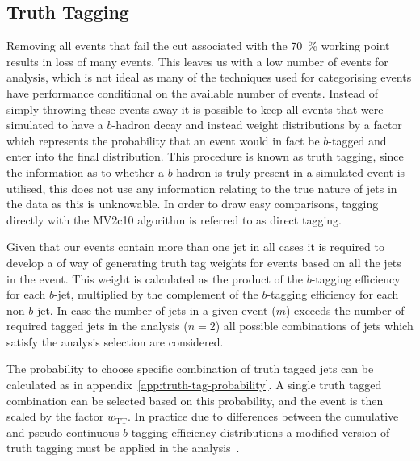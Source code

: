 \subsection{Truth Tagging}
\label{subsec:truth-tagging}

Removing all events that fail the cut associated with the 70~\% working point
results in loss of many events. This leaves us with a low number of events for
analysis, which is not ideal as many of the techniques used for categorising
events have performance conditional on the available number of events. Instead
of simply throwing these events away it is possible to keep all events that were
simulated to have a $b$-hadron decay and instead weight distributions by a
factor which represents the probability that an event would in fact be
$b$-tagged and enter into the final distribution. This procedure is known as
truth tagging, since the information as to whether a $b$-hadron is truly present
in a simulated event is utilised, this does not use any information relating to
the true nature of jets in the data as this is unknowable. In order to draw easy
comparisons, tagging directly with the MV2c10 algorithm is referred to as direct
tagging.

Given that our events contain more than one jet in all cases it is required to
develop a of way of generating truth tag weights for events based on all the
jets in the event. This weight is calculated as the product of the $b$-tagging
efficiency for each $b$-jet, multiplied by the complement of the $b$-tagging
efficiency for each non $b$-jet. In case the number of jets in a given event
($m$) exceeds the number of required tagged jets in the analysis ($n=2$) all
possible combinations of jets which satisfy the analysis selection are
considered.

The probability to choose specific combination of truth tagged jets can be
calculated as in appendix~\ref{app:truth-tag-probability}. A single truth tagged
combination can be selected based on this probability, and the event is then
scaled by the factor $w_{\mathrm {TT}}$. In practice due to differences between
the cumulative and pseudo-continuous $b$-tagging efficiency distributions a
modified version of truth tagging must be applied in the
analysis~\cite{VHObjectNote2019}.

